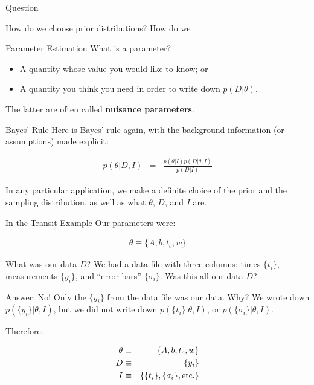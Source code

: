 \begin{frame}[t]{Question}

How do we choose prior distributions?
How do we 

\end{frame}



\begin{frame}[t]{Parameter Estimation}
What is a parameter?

\begin{itemize}
\item A quantity whose value you would like to know; or
\item A quantity you think you need in order to write down
$p(D | \theta)$.
\end{itemize}

The latter are often called {\bf nuisance parameters}.
\end{frame}


\begin{frame}[t]{Bayes' Rule}
Here is Bayes' rule again, with the background information (or assumptions)
made explicit:

\begin{eqnarray*}
p(\theta | D, I) &=& \frac{p(\theta | I)p(D | \theta, I)}{p(D | I)}
\end{eqnarray*}

In any particular application, we make a definite choice of the prior and
the sampling distribution, as well as what $\theta$, $D$, and $I$ are.

\end{frame}


\begin{frame}[t]{In the Transit Example}
Our parameters were:

\begin{eqnarray*}
\theta \equiv \{A, b, t_c, w\}
\end{eqnarray*}

What was our data $D$? We had a data file with three columns: times $\{t_i\}$,
measurements $\{y_i\}$, and ``error bars'' $\{\sigma_i\}$. Was this all our
data $D$?

\end{frame}

\begin{frame}[t]{Answer: No!}
Only the $\{y_i\}$ from the data file was our data. Why? We wrote down
$p(\{y_i\} | \theta, I)$, but we did not write down $p(\{t_i\} | \theta, I)$, or
$p(\{\sigma_i\} | \theta, I)$.

Therefore:

\begin{eqnarray*}
\theta &\equiv& \{A, b, t_c, w\}\\
D &\equiv& \{y_i\}\\
I &\equiv& \{\{t_i\}, \{\sigma_i\}, \textnormal{etc.}\}
\end{eqnarray*}

\end{frame}

